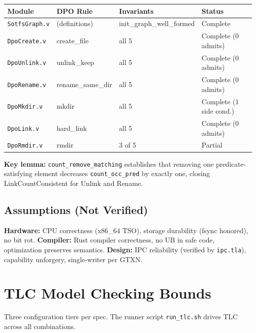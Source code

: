 \documentclass[11pt,a4paper,twoside]{report}
\theoremstyle{definition}
\begin{document}
\begin{center}\small
\begin{tabular}{llll}
\toprule
\textbf{Module} & \textbf{DPO Rule} & \textbf{Invariants} & \textbf{Status} \\
\midrule
\texttt{SotfsGraph.v} & (definitions) & init\_graph\_well\_formed & Complete \\
\texttt{DpoCreate.v} & create\_file & all 5 & Complete (0 admits) \\
\texttt{DpoUnlink.v} & unlink\_keep & all 5 & Complete (0 admits) \\
\texttt{DpoRename.v} & rename\_same\_dir & all 5 & Complete (0 admits) \\
\texttt{DpoMkdir.v} & mkdir & all 5 & Complete (1 side cond.) \\
\texttt{DpoLink.v} & hard\_link & all 5 & Complete (0 admits) \\
\texttt{DpoRmdir.v} & rmdir & 3 of 5 & Partial \\
\bottomrule
\end{tabular}
\end{center}

\textbf{Key lemma:} \texttt{count\_remove\_matching} establishes that removing one predicate-satisfying element decreases \texttt{count\_occ\_pred} by exactly one, closing LinkCountConsistent for Unlink and Rename.

\section{Assumptions (Not Verified)}
\textbf{Hardware:} CPU correctness (x86\_64 TSO), storage durability (fsync honored), no bit rot.
\textbf{Compiler:} Rust compiler correctness, no UB in safe code, optimization preserves semantics.
\textbf{Design:} IPC reliability (verified by \texttt{ipc.tla}), capability unforgery, single-writer per GTXN.

\chapter{TLC Model Checking Bounds}

Three configuration tiers per spec.  The runner script \texttt{run\_tlc.sh} drives TLC across all combinations.
\end{document}
